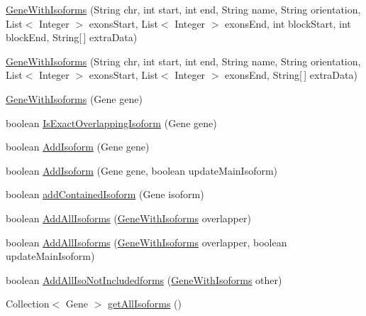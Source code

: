 \begin{DoxyCompactItemize}
\item 
\hyperlink{classbroad_1_1pda_1_1gene_1_1_gene_with_isoforms_ae96060aa1f342d17153fe8f79fcd59fa}{Gene\+With\+Isoforms} (String chr, int start, int end, String name, String orientation, List$<$ Integer $>$ exons\+Start, List$<$ Integer $>$ exons\+End, int block\+Start, int block\+End, String\mbox{[}$\,$\mbox{]} extra\+Data)
\item 
\hyperlink{classbroad_1_1pda_1_1gene_1_1_gene_with_isoforms_ad9c312f416575369b0a18182c20b38e5}{Gene\+With\+Isoforms} (String chr, int start, int end, String name, String orientation, List$<$ Integer $>$ exons\+Start, List$<$ Integer $>$ exons\+End, String\mbox{[}$\,$\mbox{]} extra\+Data)
\item 
\hyperlink{classbroad_1_1pda_1_1gene_1_1_gene_with_isoforms_aafef60f64ad9a7ab7c912dff63849624}{Gene\+With\+Isoforms} (Gene gene)
\item 
boolean \hyperlink{classbroad_1_1pda_1_1gene_1_1_gene_with_isoforms_ae0b37109038d6e424519403bb56ac6a9}{Is\+Exact\+Overlapping\+Isoform} (Gene gene)
\item 
boolean \hyperlink{classbroad_1_1pda_1_1gene_1_1_gene_with_isoforms_a50a25c0b63c11001158501afe5a889c4}{Add\+Isoform} (Gene gene)
\item 
boolean \hyperlink{classbroad_1_1pda_1_1gene_1_1_gene_with_isoforms_a84409016124ff6d4df2a5770e422d525}{Add\+Isoform} (Gene gene, boolean update\+Main\+Isoform)
\item 
boolean \hyperlink{classbroad_1_1pda_1_1gene_1_1_gene_with_isoforms_a2614242bd588391e9391825f39856a9c}{add\+Contained\+Isoform} (Gene isoform)
\item 
boolean \hyperlink{classbroad_1_1pda_1_1gene_1_1_gene_with_isoforms_ae4010284cd68a1ba4b767d3de632ec09}{Add\+All\+Isoforms} (\hyperlink{classbroad_1_1pda_1_1gene_1_1_gene_with_isoforms}{Gene\+With\+Isoforms} overlapper)
\item 
boolean \hyperlink{classbroad_1_1pda_1_1gene_1_1_gene_with_isoforms_a2296726460af323a730761c6bfb7fb9e}{Add\+All\+Isoforms} (\hyperlink{classbroad_1_1pda_1_1gene_1_1_gene_with_isoforms}{Gene\+With\+Isoforms} overlapper, boolean update\+Main\+Isoform)
\item 
boolean \hyperlink{classbroad_1_1pda_1_1gene_1_1_gene_with_isoforms_a7052c23704cb62502168291d0125d162}{Add\+All\+Iso\+Not\+Includedforms} (\hyperlink{classbroad_1_1pda_1_1gene_1_1_gene_with_isoforms}{Gene\+With\+Isoforms} other)
\item 
Collection$<$ Gene $>$ \hyperlink{classbroad_1_1pda_1_1gene_1_1_gene_with_isoforms_a1cd8024fd5795d9f98202731d0d58ba2}{get\+All\+Isoforms} ()

\end{DoxyCompactItemize}
